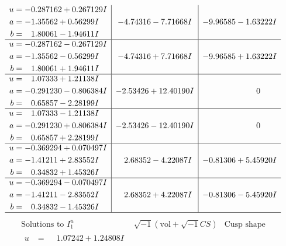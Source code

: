 \documentclass[1p]{elsarticle_modified}
\theoremstyle{definition}
\newcommand{\I}{\sqrt{-1}}
\begin{document}
$$\begin{array}{c|c|c}
\begin{aligned}
u &= -0.287162 + 0.267129 I \\
a &= -1.35562 + 0.56299 I \\
b &= \phantom{-}1.80061 - 1.94611 I\end{aligned}
 & -4.74316 - 7.71668 I & -9.96585 - 1.63222 I \\ \hline\begin{aligned}
u &= -0.287162 - 0.267129 I \\
a &= -1.35562 - 0.56299 I \\
b &= \phantom{-}1.80061 + 1.94611 I\end{aligned}
 & -4.74316 + 7.71668 I & -9.96585 + 1.63222 I \\ \hline\begin{aligned}
u &= \phantom{-}1.07333 + 1.21138 I \\
a &= -0.291230 - 0.806384 I \\
b &= \phantom{-}0.65857 - 2.28199 I\end{aligned}
 & -2.53426 + 12.40190 I & \phantom{-0.000000 } 0 \\ \hline\begin{aligned}
u &= \phantom{-}1.07333 - 1.21138 I \\
a &= -0.291230 + 0.806384 I \\
b &= \phantom{-}0.65857 + 2.28199 I\end{aligned}
 & -2.53426 - 12.40190 I & \phantom{-0.000000 } 0 \\ \hline\begin{aligned}
u &= -0.369294 + 0.070497 I \\
a &= -1.41211 + 2.83552 I \\
b &= \phantom{-}0.34832 + 1.45326 I\end{aligned}
 & \phantom{-}2.68352 - 4.22087 I & -0.81306 + 5.45920 I \\ \hline\begin{aligned}
u &= -0.369294 - 0.070497 I \\
a &= -1.41211 - 2.83552 I \\
b &= \phantom{-}0.34832 - 1.45326 I\end{aligned}
 & \phantom{-}2.68352 + 4.22087 I & -0.81306 - 5.45920 I\\
 \hline 
 \end{array}$$\newpage$$\begin{array}{c|c|c}  
\text{Solutions to }I^u_{1}& \I (\text{vol} + \sqrt{-1}CS) & \text{Cusp shape}\\
 \hline 
\begin{aligned}
u &= \phantom{-}1.07242 + 1.24808 I \\

\end{aligned}
\end{array}$$
\end{document}
